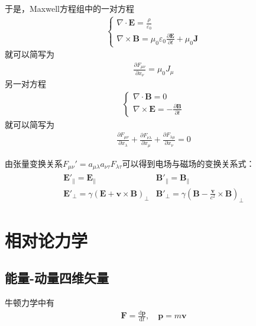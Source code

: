 \documentclass[main.tex]{subfiles}
\begin{document}
于是，Maxwell方程组中的一对方程
\begin{align}
    \left\{\begin{array}{l}
    \nabla \cdot \boldsymbol{E} = \displaystyle \frac{\rho}{\varepsilon _0}\\
    \nabla \times \boldsymbol{B} = \displaystyle \mu_0 \varepsilon _0 \frac{\partial \boldsymbol{E}}{\partial t} + \mu_0 \boldsymbol{J}
    \end{array}\right.
\end{align}
就可以简写为
\begin{align}
    \frac{\partial F_{\mu \nu}}{\partial x_{\nu}} = \mu _0J_{\mu}
\end{align}
另一对方程
\begin{align}
    \left\{\begin{array}{l}
    \nabla \cdot \boldsymbol{B} = 0\\
    \nabla \times \boldsymbol{E} = \displaystyle - \frac{\partial \boldsymbol{B}}{\partial t}
    \end{array}\right.
\end{align}
就可以简写为
\begin{align}
    \frac{\partial F_{\mu \nu}}{\partial x_{\lambda}} + \frac{\partial F_{\nu \lambda}}{\partial x_{\mu}} + \frac{\partial F_{\lambda \mu}}{\partial x_{\nu}} = 0
\end{align}

由张量变换关系$F_{\mu \nu}' = a_{\mu \lambda}a_{\nu \tau}F_{\lambda \tau}$可以得到电场与磁场的变换关系式：
\begin{align}
    \begin{array}{cc}
        \boldsymbol{E}'_\parallel = \boldsymbol{E}_\parallel  & \boldsymbol{B}'_\parallel = \boldsymbol{B}_\parallel \\
        \boldsymbol{E}'_\perp  = \gamma (\boldsymbol{E}+ \boldsymbol{v} \times \boldsymbol{B})_\perp  & \boldsymbol{B}'_\perp  = \gamma (\boldsymbol{B}-\displaystyle \frac{\boldsymbol{v}}{c^2} \times \boldsymbol{B})_\perp
    \end{array}
\end{align}

\section{相对论力学}
\subsection{能量-动量四维矢量}
牛顿力学中有
\begin{align}
    \boldsymbol{F} = \frac{\mathrm{d}\boldsymbol{p}}{\mathrm{d}t},\quad \boldsymbol{p} = m\boldsymbol{v}
\end{align}
\end{document}
